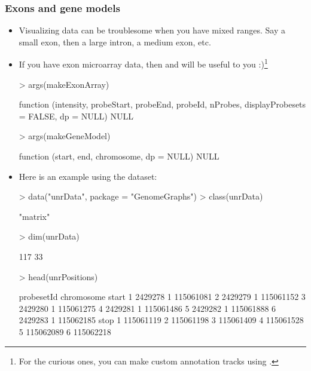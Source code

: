 \begin{frame}
  \frametitle{Exons and gene models}
  \begin{itemize}
  \item Visualizing data can be troublesome when you have mixed ranges. Say a small exon, then a large intron, a medium exon, etc.
  \item If you have exon microarray data, then  and  will be useful to you :)\footnote{For the curious ones, you can make custom annotation tracks using .} \scriptsize
\begin{Schunk}
\begin{Sinput}
> args(makeExonArray)
\end{Sinput}
\begin{Soutput}
function (intensity, probeStart, probeEnd, probeId, nProbes, 
    displayProbesets = FALSE, dp = NULL) 
NULL
\end{Soutput}
\begin{Sinput}
> args(makeGeneModel)
\end{Sinput}
\begin{Soutput}
function (start, end, chromosome, dp = NULL) 
NULL
\end{Soutput}
\end{Schunk}
\normalsize
  \item Here is an example using the  dataset:
\begin{Schunk}
\begin{Sinput}
> data("unrData", package = "GenomeGraphs")
> class(unrData)
\end{Sinput}
\begin{Soutput}
[1] "matrix"
\end{Soutput}
\begin{Sinput}
> dim(unrData)
\end{Sinput}
\begin{Soutput}
[1] 117  33
\end{Soutput}
\begin{Sinput}
> head(unrPositions)
\end{Sinput}
\begin{Soutput}
  probesetId chromosome     start
1    2429278          1 115061081
2    2429279          1 115061152
3    2429280          1 115061275
4    2429281          1 115061486
5    2429282          1 115061888
6    2429283          1 115062185
       stop
1 115061119
2 115061198
3 115061409
4 115061528
5 115062089
6 115062218

\end{Soutput}
\end{Schunk}
\end{itemize}
\end{frame}

